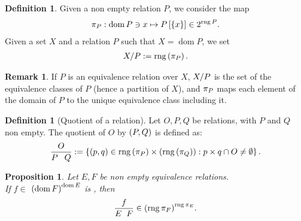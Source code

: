 \documentclass[oneside
]
{article}
\theoremstyle{plain}
\newtheorem{Prop}[Cor]{Proposition}
\theoremstyle{definition}
\newtheorem{Def}[Cor]{Definition}
\newtheorem{Rem}[Cor]{Remark}
\DeclareMathOperator{\rng}{rng}
\DeclareMathOperator{\dom}{dom}
\begin{document}
\begin{Def}
Given a non empty relation $P$, we consider the map
\begin{align*}
\toClass{P} : \dom P \ni x \mapsto \im{P}{\left\{ x \right\}} \in \powset{\rng P}.
\end{align*}
Given a set $X$ and a relation $P$ such that $X = \dom P$, we set
\begin{align*}
\Classes{X}{P} := \rng \left( \toClass {P} \right).
\end{align*}
\end{Def}

\begin{Rem}
If $P$ is an equivalence relation over $X$, ${X}/{P}$ is the set of the equivalence classes of $P$ (hence a partition of $X$), and $\pi_{P}$ maps each element of the domain of $P$ to the unique equivalence class including it.
\end{Rem}

\begin{Def}[Quotient of a relation]
\label{RefDefQuotient}
Let $O, P, Q$ be relations, with $P$ and $Q$ non empty. 
The quotient of $O$ by $\left( {P}, {Q} \right)$ is defined as:
\begin{align*}
\quotient{O}{P}{Q} := \left\{
\pair{p}{q} \in \rng \left( \toClass{P} \right) \cartprod \left( \rng \left( \toClass{Q} \right) \right) : 
p \cartprod q \cap O \neq \emp 
\right\}.
\end{align*}
\end{Def}

\begin{Prop}
\label{RefThmCompatibleFunction}
Let  $E, F$ be non empty equivalence relations.
\\
If $f \in$ 
$\mapsFromTo{\dom E}{\left( \dom F \right)}$ 
is , then
\begin{align*}
\quotient{f}{E}{F} \in \mapsFromTo{\rng  \toClass{E} }{ \left( \rng  \toClass{F} \right)}.
\end{align*}
\end{Prop}
\end{document}
